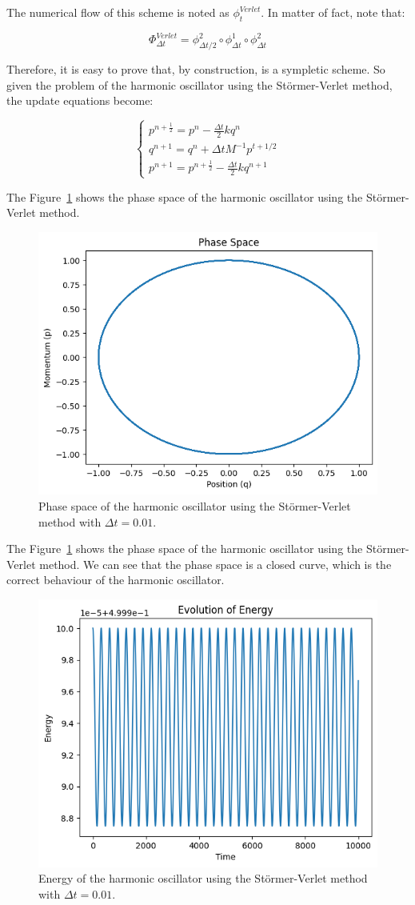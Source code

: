 \documentclass{article}
\begin{document}
The numerical flow of this scheme is noted as \(\phi^{Verlet}_t\). In matter of fact, note that:

\[
	\Phi^{Verlet}_{\Delta t} = \phi^2_{\Delta t/2} \circ \phi^1_{\Delta t} \circ \phi^2_{\Delta t}
\]


Therefore, it is easy to prove that, by construction, is a sympletic scheme. So given the problem of the harmonic oscillator using the Störmer-Verlet method, the update equations become:

\begin{equation}
	\begin{cases}
		p^{n + \frac{1}{2}} = p^n - \frac{\Delta t}{2} kq^n \\
		q^{n+1} = q^{n} + \Delta t M^{-1} p^{t+1/2} \\
		p^{n+1} = p^{n+\frac{1}{2}} - \frac{\Delta t}{2} kq^{n+1}
	\end{cases}
	\label{eq:stormerverletharmonic}
\end{equation}

The Figure~\ref{fig:stormerverletphase} shows the phase space of the harmonic oscillator using the Störmer-Verlet method.

\begin{figure}[H]
	\centering
	\includegraphics[width=0.5\linewidth]{./Figures/Sympletic/verletphase.png}
	\caption{Phase space of the harmonic oscillator using the Störmer-Verlet method with \(\Delta t = 0.01\).}
	\label{fig:stormerverletphase}
\end{figure}

The Figure~\ref{fig:stormerverletphase} shows the phase space of the harmonic oscillator using the Störmer-Verlet method. We can see that the phase space is a closed curve, which is the correct behaviour of the harmonic oscillator.

\begin{figure}[H]
	\centering
	\includegraphics[width=0.5\linewidth]{./Figures/Sympletic/verletenergy.png}
	\caption{Energy of the harmonic oscillator using the Störmer-Verlet method with \(\Delta t = 0.01\).}
	\label{fig:stormerverletenergy}
\end{figure}
\end{document}
